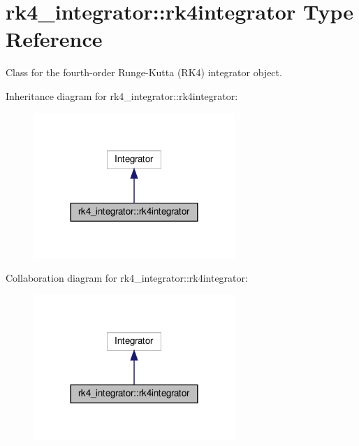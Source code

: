 \hypertarget{structrk4__integrator_1_1rk4integrator}{}\section{rk4\+\_\+integrator\+:\+:rk4integrator Type Reference}
\label{structrk4__integrator_1_1rk4integrator}


Class for the fourth-\/order Runge-\/\+Kutta (R\+K4) integrator object.  




Inheritance diagram for rk4\+\_\+integrator\+:\+:rk4integrator\+:\nopagebreak
\begin{figure}[H]
\begin{center}
\leavevmode
\includegraphics[width=216pt]{structrk4__integrator_1_1rk4integrator__inherit__graph}
\end{center}
\end{figure}


Collaboration diagram for rk4\+\_\+integrator\+:\+:rk4integrator\+:\nopagebreak
\begin{figure}[H]
\begin{center}
\leavevmode
\includegraphics[width=216pt]{structrk4__integrator_1_1rk4integrator__coll__graph}
\end{center}
\end{figure}
